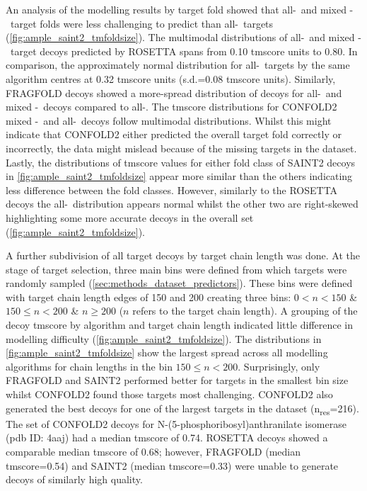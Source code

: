 An analysis of the modelling results by target fold showed that all-\textalpha\ and mixed \textalpha-\textbeta\ target folds were less challenging to predict than all-\textbeta\ targets (\cref{fig:ample_saint2_tmfoldsize}). The multimodal distributions of all-\textalpha\ and mixed \textalpha-\textbeta\ target decoys predicted by ROSETTA spans from 0.10 \gls{tmscore} units to 0.80. In comparison, the approximately normal distribution for all-\textbeta\ targets by the same algorithm centres at 0.32 \gls{tmscore} units (s.d.=0.08 \gls{tmscore} units). Similarly, FRAGFOLD decoys showed a more-spread distribution of decoys for all-\textalpha\ and mixed \textalpha-\textbeta\ decoys compared to all-\textbeta. The \gls{tmscore} distributions for CONFOLD2 mixed \textalpha-\textbeta\ and all-\textbeta\ decoys follow multimodal distributions. Whilst this might indicate that CONFOLD2 either predicted the overall target fold correctly or incorrectly, the data might mislead because of the missing targets in the dataset. Lastly, the distributions of \gls{tmscore} values for either fold class of SAINT2 decoys in \cref{fig:ample_saint2_tmfoldsize} appear more similar than the others indicating less difference between the fold classes. However, similarly to the ROSETTA decoys the all-\textbeta\ distribution appears normal whilst the other two are right-skewed highlighting some more accurate decoys in the overall set (\cref{fig:ample_saint2_tmfoldsize}).

A further subdivision of all target decoys by target chain length was done. At the stage of target selection, three main bins were defined from which targets were randomly sampled (\cref{sec:methods_dataset_predictors}). These bins were defined with target chain length edges of 150 and 200 creating three bins: $0 < n < 150$ \& $150 \leq n < 200$ \& $n \geq 200$ ($n$ refers to the target chain length). A grouping of the decoy \gls{tmscore} by algorithm and target chain length indicated little difference in modelling difficulty (\cref{fig:ample_saint2_tmfoldsize}). The distributions in \cref{fig:ample_saint2_tmfoldsize} show the largest spread across all modelling algorithms for chain lengths in the bin $150 \leq n < 200$. Surprisingly, only FRAGFOLD and SAINT2 performed better for targets in the smallest bin size whilst CONFOLD2 found those targets most challenging. CONFOLD2 also generated the best decoys for one of the largest targets in the dataset (n\textsubscript{res}=216). The set of CONFOLD2 decoys for N-(5-phosphoribosyl)anthranilate isomerase (\gls{pdb} ID: 4aaj) had a median \gls{tmscore} of 0.74. ROSETTA decoys showed a comparable median \gls{tmscore} of 0.68; however, FRAGFOLD (median \gls{tmscore}=0.54) and SAINT2 (median \gls{tmscore}=0.33) were unable to generate decoys of similarly high quality.


